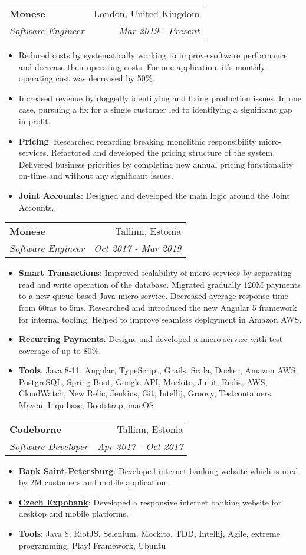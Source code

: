 \documentclass[letterpaper,11pt]{article}
\makeatletter
\newcommand{\resumeItem}[2]{
  \item\small{
    \textbf{#1}{: #2 \vspace{-2pt}}
  }
}
\newcommand{\resumeItemWithoutTitle}[2]{
  \item\small{
    \textbf{#1}{#2\vspace{-2pt}}
  }
}
\newcommand{\resumeSubheading}[4]{
  \vspace{-1pt}\item
    \begin{tabular*}{0.97\textwidth}[t]{l@{\extracolsep{\fill}}r}
      \textbf{#1} & #2 \\
      \textit{\small#3} & \textit{\small #4} \\
    \end{tabular*}\vspace{-5pt}
}
\newcommand{\resumeSubSubheading}[2]{
    \begin{tabular*}{0.97\textwidth}{l@{\extracolsep{\fill}}r}
      \textit{\small#1} & \textit{\small #2} \\
    \end{tabular*}\vspace{-5pt}
}
\newcommand{\resumeItemListStart}{\begin{itemize}}
\newcommand{\resumeItemListEnd}{\end{itemize}\vspace{-5pt}}
\makeatother
\begin{document}
    \resumeSubheading
      {Monese}{London, United Kingdom}
      {Software Engineer}{Mar 2019 - Present}
      \resumeItemListStart
        \resumeItemWithoutTitle{}
        {Reduced costs by systematically working to improve software performance and decrease their 
        operating costs. For one application, it’s monthly operating cost was decreased by 50\%.}
        \resumeItemWithoutTitle{}
        {Increased revenue by doggedly identifying and fixing production issues. In one case, 
        pursuing a fix for a single customer led to identifying a significant gap in profit.}
        \resumeItem{Pricing}
        {Researched regarding breaking monolithic responsibility micro-services. Refactored and 
        developed the pricing structure of the system. Delivered business priorities by completing 
        new annual pricing functionality on-time and without any significant issues.}
        \resumeItem{Joint Accounts}
        {Designed and developed the main logic around the Joint Accounts.}
      \resumeItemListEnd

  \resumeSubheading
  {Monese}{Tallinn, Estonia}
  {Software Engineer}{Oct 2017 - Mar 2019}
  \resumeItemListStart
    \resumeItem{Smart Transactions}
      {Improved scalability of micro-services by separating read and write operation of the database. 
      Migrated gradually 120M payments to a new queue-based Java micro-service. Decreased average response
      time from 60ms to 5ms. Researched and introduced the new Angular 5 framework for internal tooling. 
      Helped to improve seamless deployment in Amazon AWS.}
    \resumeItem{Recurring Payments}
      {Designe and developed a micro-service with test coverage of up to 80\%.}
    \resumeItem{Tools}
      {Java 8-11, Angular, TypeScript, Grails, Scala, Docker, Amazon AWS, PostgreSQL, Spring Boot, 
      Google API, Mockito, Junit, Redis, AWS, CloudWatch, New Relic, Jenkins, Git, Intellij, Groovy, 
      Testcontainers, Maven, Liquibase, Bootstrap, macOS}
  \resumeItemListEnd
    \resumeSubheading
      {Codeborne}{Tallinn, Estonia}
      {Software Developer}{Apr 2017 - Oct 2017}
      \resumeItemListStart
        \resumeItem{Bank Saint-Petersburg}
          {Developed internet banking website which is used by 2M customers and mobile application.}
        \resumeItem{\href{https://expobanking.cz/}{Czech Expobank}}
          {Developed a responsive internet banking website for desktop and mobile platforms.}
        \resumeItem{Tools}
        {Java 8, RiotJS, Selenium, Mockito, TDD, Intellij, Agile, extreme programming, Play! Framework, 
        Ubuntu}
      \resumeItemListEnd
\end{document}
